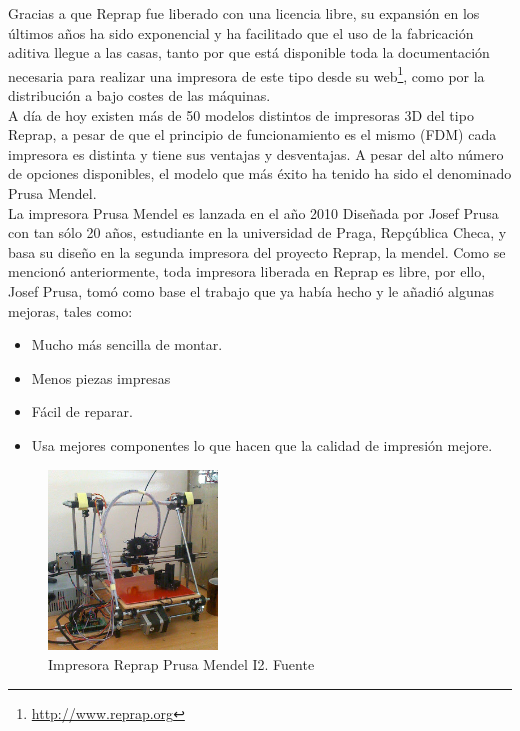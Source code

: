 Gracias a que Reprap fue liberado con una licencia libre, su expansión en los últimos años ha sido exponencial y ha facilitado que el uso de la fabricación aditiva llegue a las casas, tanto por que está disponible toda la documentación necesaria para realizar una impresora de este tipo desde su web\footnote{\url{http://www.reprap.org}}, como por la distribución a bajo costes de las máquinas.\\

A día de hoy existen más de 50 modelos distintos de impresoras 3D del tipo Reprap, a pesar de que el principio de funcionamiento es el mismo (FDM) cada impresora es distinta y tiene sus ventajas y desventajas. A pesar del alto número de opciones disponibles, el modelo que más éxito ha tenido ha sido el denominado Prusa Mendel.\\

La impresora Prusa Mendel es lanzada en el año 2010 Diseñada por Josef Prusa con tan sólo 20 años, estudiante en la universidad de Praga, Repçública Checa, y basa su diseño
en la segunda impresora del proyecto Reprap, la mendel. Como se mencionó anteriormente, toda impresora liberada en Reprap es libre, por ello, Josef Prusa, tomó como base el trabajo que ya había hecho y le añadió algunas mejoras, tales como:
\begin{itemize}
    \item Mucho más sencilla de montar.
    \item Menos piezas impresas
    \item Fácil de reparar.
    \item Usa mejores componentes lo que hacen que la calidad de impresión mejore.
\end{itemize}

\begin{figure}[H]
        \centering
        \includegraphics[width=0.4\textwidth]{images/prusa_i2.jpg}
        \caption{Impresora Reprap Prusa Mendel I2. Fuente \cite{prusai2}}
        \label{fig:estado_i2}
\end{figure}

